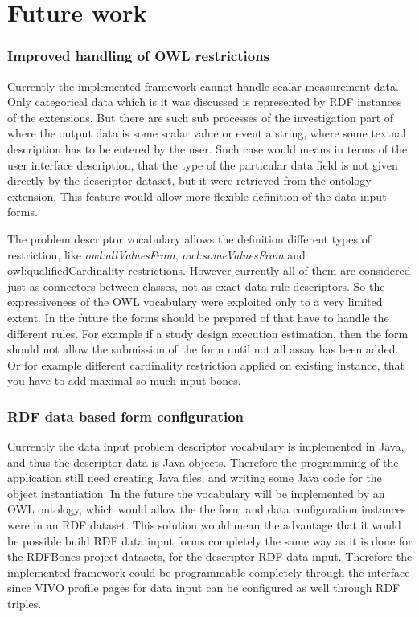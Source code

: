 \section{Future work}

\subsubsection{Improved handling of OWL restrictions}

Currently the implemented framework cannot handle scalar measurement data. Only categorical data which is it was discussed is represented by RDF instances of the extensions. But there are such sub processes of the investigation part of where the output data is some scalar value or event a string, where some textual description has to be entered by the user. Such case would means in terms of the user interface description, that the type of the particular data field is not given directly by the descriptor dataset, but it were retrieved from the ontology extension. This feature would allow more flexible definition of the data input forms.


The problem descriptor vocabulary allows the definition different types of restriction, like \textit{owl:allValuesFrom}, \textit{owl:someValuesFrom} and owl:qualifiedCardinality restrictions. However currently all of them are considered just as connectors between classes, not as exact data rule descriptors. So the expressiveness of the OWL vocabulary were exploited only to a very limited extent. In the future the forms should be prepared of that have to handle the different rules. For example if a study design execution estimation, then the form should not allow the submission of the form until not all assay has been added. Or for example different cardinality restriction applied on existing instance, that you have to add maximal so much input bones. 


\subsubsection{RDF data based form configuration}


Currently the data input problem descriptor vocabulary is implemented in Java, and thus the descriptor data is Java objects. Therefore the programming of the application still need creating Java files, and writing some Java code for the object instantiation. In the future the vocabulary will be implemented by an OWL ontology, which would allow the the form and data configuration instances were in an RDF dataset. This solution would mean the advantage that it would be possible build RDF data input forms completely the same way as it is done for the RDFBones project datasets, for the descriptor RDF data input. Therefore the implemented framework could be programmable completely through the interface since VIVO profile pages for data input can be configured as well through RDF triples.







